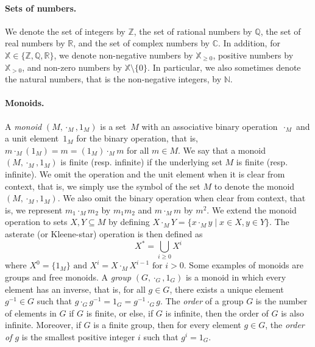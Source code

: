 \documentclass{llncs}
\begin{document}
\paragraph*{Sets of numbers.}
We denote the set of integers by \(\mathbb{Z}\),  the set of rational numbers by \(\mathbb{Q}\), the set of real numbers by \(\mathbb{R}\), and the set of complex numbers by \(\mathbb{C}\).
In addition, for \(\mathbb{X} \in \{\mathbb{Z}, \mathbb{Q}, \mathbb{R}\}\), we denote non-negative numbers by \(\mathbb{X}_{\ge 0}\), positive numbers by \(\mathbb{X}_{> 0}\), and non-zero numbers by \(\mathbb{X} \setminus \{0\}\).
In particular, we also sometimes denote the natural numbers, that is the non-negative integers, by \(\mathbb{N}\). 

\paragraph*{Monoids.}
A \emph{monoid} $(M, \cdot_M, 1_M)$ is a set~$M$ with an associative binary operation~$\cdot_M$ and a unit element~$1_M$ for the binary operation, that is, $m \cdot_M (1_M) = m = (1_M) \cdot_M m$ for all $m \in M$.
We say that a monoid \((M, \cdot_M, 1_M)\) is finite (resp. infinite) if the underlying set \(M\) is finite (resp. infinite).
We omit the operation and the unit element when it is clear from context, that is, we simply use the symbol of the set $M$ to denote the monoid $(M, \cdot_M, 1_M)$.
We also omit the binary operation when clear from context, that is, we represent $m_1 \cdot_M m_2$ by $m_1 m_2$ and $m \cdot_M m $ by $m^2$.
We extend the monoid operation to sets $X, Y \subseteq M$ by defining $X \cdot_M Y = \{x \cdot_M y \mid x \in X, y \in Y\}$. The asterate (or Kleene-star) operation is then defined as 
\begin{equation*}
    X^* = \bigcup\limits_{i\ge 0} X^i
\end{equation*}
where $X^0 = \{1_M\} \text{ and } X^i = X \cdot_M X^{i-1} \text{ for } i > 0$.
Some examples of monoids are groups and free monoids.
A \emph{group} $(G, \cdot_G, 1_G)$ is a monoid in which every element has an inverse, that is, for all \(g \in G\), there exists a unique element \(g^{-1} \in G\) such that \(g \cdot_G g^{-1} = 1_{G} = g^{-1} \cdot_{G} g\).
The \emph{order} of a group $G$ is the number of elements in $G$ if $G$ is finite, or else, if $G$ is infinite, then the order of $G$ is also infinite.
Moreover, if \(G\) is a finite group, then for every element $g \in G$, the \emph{order of $g$} is the smallest positive integer $i$ such that $g^i = 1_G$.
\end{document}
